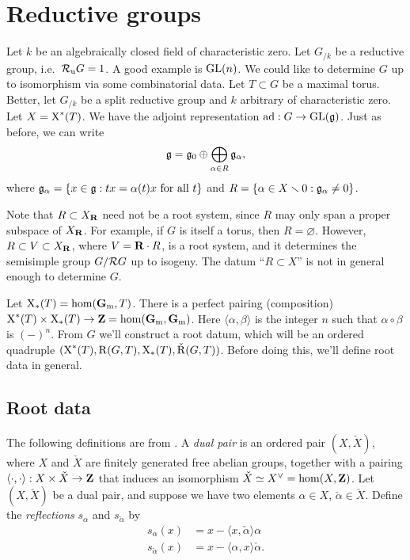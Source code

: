 
\section{Reductive groups}

Let $k$ be an algebraically closed field of characteristic zero. Let 
$G_{/k}$ be a reductive group, i.e.~$\mathcal{R}_\mathrm{u} G=1$. A good example is $\operatorname{GL}(n)$. 
We could like to determine $G$ up to isomorphism via some combinatorial data. 
Let $T\subset G$ be a maximal torus. Better, let $G_{/k}$ be a split reductive 
group and $k$ arbitrary of characteristic zero. Let $X=\operatorname{X}^\ast(T)$. 
We have the adjoint representation $\operatorname{ad}:G\to \operatorname{GL}(\mathfrak{g})$. Just as before, we 
can write 
\[
  \mathfrak{g} = \mathfrak{g}_0\oplus \bigoplus_{\alpha\in R} \mathfrak{g}_\alpha ,
\]
where $\mathfrak{g}_\alpha=\{x\in \mathfrak{g}:t x=\alpha(t) x\text{ for all }t\}$ and 
$R=\{\alpha\in X\smallsetminus 0:\mathfrak{g}_\alpha\ne 0\}$. 

Note that $R\subset X_{\mathbf{R}}$ need not be a root system, since $R$ may only span a 
proper subspace of $X_{\mathbf{R}}$. For example, if $G$ is itself a torus, then 
$R=\varnothing$. However, $R\subset V\subset X_{\mathbf{R}}$, where $V=\mathbf{R}\cdot R$, is a 
root system, and it determines the semisimple group $G/\mathcal{R} G$ up to isogeny. 
The datum ``$R\subset X$'' is not in general enough to determine $G$. 

Let $\operatorname{X}_\ast(T)=\hom(\mathbf{G}_\mathrm{m},T)$. There is a perfect pairing (composition) 
$\operatorname{X}^\ast(T)\times \operatorname{X}_\ast(T)\to \mathbf{Z}=\hom(\mathbf{G}_\mathrm{m},\mathbf{G}_\mathrm{m})$. Here 
$\langle \alpha,\beta\rangle$ is the integer $n$ such that 
$\alpha\circ\beta$ is $(-)^n$. From $G$ we'll construct a root datum, which 
will be an ordered quadruple 
$(\operatorname{X}^\ast(T),\operatorname{R}(G,T),\operatorname{X}_\ast(T),\check{\operatorname{R}}(G,T))$. 
Before doing this, we'll define root data in general. 





\subsection{Root data}\label{sec:root-data}

The following definitions are from \cite[XXI]{sga3-iii}. A \emph{dual pair} 
is an ordered pair $(X,\check X)$, where $X$ and $\check X$ are finitely 
generated free abelian groups, together with a pairing 
$\langle\cdot,\cdot\rangle:X\times \check X\to \mathbf{Z}$ that induces an isomorphism 
$\check X\simeq X^\vee=\hom(X,\mathbf{Z})$. Let $(X,\check X)$ be a dual pair, and 
suppose we have two elements $\alpha\in X$, $\check\alpha\in \check X$. Define 
the \emph{reflections} $s_\alpha$ and $s_{\check\alpha}$ by 
\begin{align*}
  s_\alpha(x) &= x-\langle x,\check\alpha\rangle\alpha \\
  s_{\check\alpha}(x) &= x-\langle\alpha,x\rangle\check\alpha .
\end{align*}

